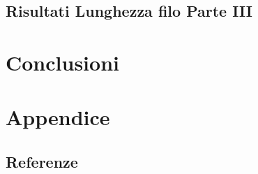\documentclass[a4paper,10pt,oneside]{memoir}
\begin{document}
\subsection{Risultati Lunghezza filo Parte III}

\section{Conclusioni}


\appendix
\renewcommand{\thesection}{\Alph{subsection}}
\renewcommand{\thesubsection}{\Alph{subsection}}
\section*{Appendice}


\subsection{Referenze}

\end{document}

